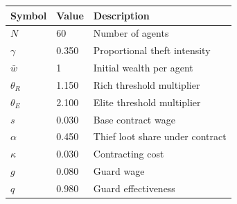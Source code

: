 \begin{tabular}{lll}
\toprule
Symbol & Value & Description \\
\midrule
$N$ & 60 & Number of agents \\
$\gamma$ & 0.350 & Proportional theft intensity \\
$\bar{w}$ & 1 & Initial wealth per agent \\
$\theta_R$ & 1.150 & Rich threshold multiplier \\
$\theta_E$ & 2.100 & Elite threshold multiplier \\
$s$ & 0.030 & Base contract wage \\
$\alpha$ & 0.450 & Thief loot share under contract \\
$\kappa$ & 0.030 & Contracting cost \\
$g$ & 0.080 & Guard wage \\
$q$ & 0.980 & Guard effectiveness \\
\bottomrule
\end{tabular}
